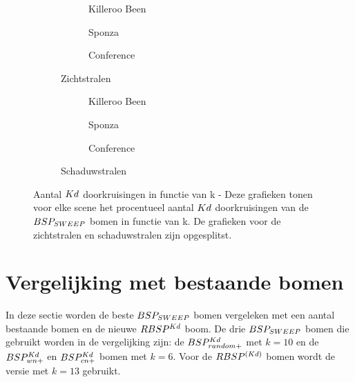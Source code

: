 \begin{figure}
  \centering
  \begin{subfigure}{\linewidth}
  \centering
  \begin{subfigure}[t]{.32\linewidth}
    \centering
{}
\caption{Killeroo Been}
  \end{subfigure}
  \begin{subfigure}[t]{.32\linewidth}
    \centering
{}
\caption{Sponza}
\end{subfigure}
\begin{subfigure}[t]{.32\linewidth}
  \centering
{}
\caption{Conference}
\end{subfigure}
\caption{Zichtstralen}
\end{subfigure}
\begin{subfigure}{\linewidth}
  \centering
  \begin{subfigure}[t]{.32\linewidth}
    \centering
{}
\caption{Killeroo Been}
  \end{subfigure}
  \begin{subfigure}[t]{.32\linewidth}
    \centering
{}
\caption{Sponza}
\end{subfigure}
\begin{subfigure}[t]{.32\linewidth}
  \centering
{}
\caption{Conference}
\end{subfigure}
\caption{Schaduwstralen}
\end{subfigure}
\caption[Aantal $\symKd$ doorkruisingen in functie van k]{Aantal $\symKd$ doorkruisingen in functie van k - \small Deze grafieken tonen voor elke scene het procentueel aantal $\symKd$ doorkruisingen van de $BSP_{SWEEP}$ bomen in functie van k. De grafieken voor de zichtstralen en schaduwstralen zijn opgesplitst.}
\label{fig:k-kd-doorkruisingen-prec}
\end{figure}


\section{Vergelijking met bestaande bomen}
\label{h5-vergelijken}
In deze sectie worden de beste $BSP_{SWEEP}$ bomen vergeleken met een aantal bestaande bomen en de nieuwe $RBSP^{Kd}$ boom.
De drie $BSP_{SWEEP}$ bomen die gebruikt worden in de vergelijking zijn: de $BSP^{Kd}_{random+}$ met $k = 10$ en de $BSP^{Kd}_{wn+}$ en $BSP^{Kd}_{cn+}$ bomen met $k = 6$.
Voor de $RBSP^{(Kd)}$ bomen wordt de versie met $k = 13$ gebruikt.

